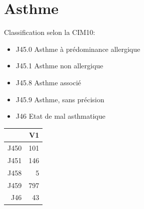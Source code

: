 \documentclass[12pt,english,french,twoside]{report}\usepackage[]{graphicx}\usepackage[]{color}
\begin{document}
\section{Asthme}

Classification selon la CIM10:
\begin{itemize}
  \item J45.0 Asthme à prédominance allergique
  \item J45.1 Asthme non allergique
  \item J45.8 Asthme associé 
  \item J45.9 Asthme, sans précision
  \item J46   Etat de mal asthmatique
\end{itemize}

\begin{table}[ht]
\centering
\begin{tabular}{rr}
  \hline
 & V1 \\ 
  \hline
J450 & 101 \\ 
  J451 & 146 \\ 
  J458 &   5 \\ 
  J459 & 797 \\ 
  J46 &  43 \\ 
   \hline
\end{tabular}
\end{table}
\end{document}

